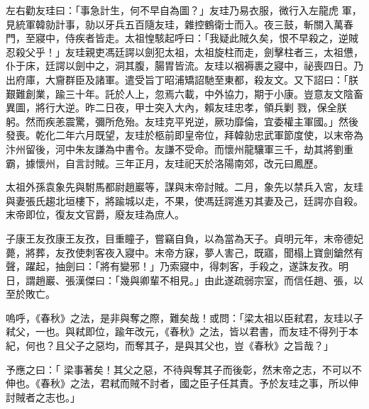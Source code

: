 \begin{pinyinscope}
 左右勸友珪曰：「事急計生，何不早自為圖？」友珪乃易衣服，微行入左龍虎
 軍，見統軍韓勍計事，勍以牙兵五百隨友珪，雜控鶴衛士而入。夜三鼓，斬關入萬春門，至寢中，侍疾者皆走。太祖惶駭起呼曰：「我疑此賊久矣，恨不早殺之，逆賊忍殺父乎！」友珪親吏馮廷諤以劍犯太祖，太祖旋柱而走，劍擊柱者三，太祖憊，仆于床，廷諤以劍中之，洞其腹，腸胃皆流。友珪以裀褥裹之寢中，祕喪四日。乃出府庫，大齎群臣及諸軍。遣受旨丁昭浦矯詔馳至東都，殺友文。又下詔曰：「朕艱難創業，踰三十年。託於人上，忽焉六載，中外協力，期于小康。豈意友文陰畜異圖，將行大逆。昨二日夜，甲士突入大內，賴友珪忠孝，領兵剿
 戮，保全朕躬。然而疾恙震驚，彌所危殆。友珪克平兇逆，厥功靡倫，宜委權主軍國。」然後發喪。乾化二年六月既望，友珪於柩前即皇帝位，拜韓勍忠武軍節度使，以末帝為汴州留後，河中朱友謙為中書令。友謙不受命。而懷州龍驤軍三千，劫其將劉重霸，據懷州，自言討賊。三年正月，友珪祀天於洛陽南郊，改元曰鳳歷。



 太祖外孫袁象先與駙馬都尉趙巖等，謀與末帝討賊。二月，象先以禁兵入宮，友珪與妻張氏趨北垣樓下，將踰城以走，不果，使馮廷諤進刃其妻及己，廷諤亦自殺。末帝即位，復友文官爵，廢友珪為庶人。



 子康王友孜康王友孜，目重瞳子，嘗竊自負，以為當為天子。貞明元年，末帝德妃薨，將葬，友孜使刺客夜入寢中。末帝方寐，夢人害己，既寤，聞榻上寶劍鎗然有聲，躍起，抽劍曰：「將有變邪！」乃索寢中，得刺客，手殺之，遂誅友孜。明日，謂趙巖、張漢傑曰：「幾與卿輩不相見。」由此遂疏弱宗室，而信任趙、張，以至於敗亡。



 嗚呼，《春秋》之法，是非與奪之際，難矣哉！或問：「梁太祖以臣弒君，友珪以子弒父，一也。與弒即位，踰年改元，《春秋》之法，皆以君書，而友珪不得列于本紀，何也？且父子之惡均，而奪其子，是與其父也，豈《春秋》之旨哉？」



 予應之曰：「
 梁事著矣！其父之惡，不待與奪其子而後彰，然末帝之志，不可以不伸也。《春秋》之法，君弒而賊不討者，國之臣子任其責。予於友珪之事，所以伸討賊者之志也。」



\end{pinyinscope}